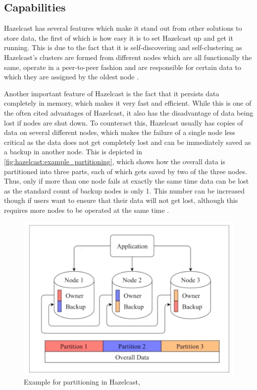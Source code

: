 \subsection{Capabilities} \label{subsec:capabilitiesHazelcast}

Hazelcast has several features which make it stand out from other solutions to store data, the first of which is how easy it is
to set Hazelcast up and get it running. This is due to the fact that it is self-discovering and self-clustering as Hazelcast's
clusters are formed from different nodes which are all functionally the same, operate in a peer-to-peer fashion and are responsible for
certain data to which they are assigned by the oldest node \parencite{Johns.2015}.

Another important feature of Hazelcast is the fact that it persists data completely in memory, which makes it very fast and efficient.
While this is one of the often cited advantages of Hazelcast, it also has the disadvantage of data being lost if nodes are shut down. To counteract this, Hazelcast usually has copies of data on several different nodes, which
makes the failure of a single node less critical as the data does not get completely lost and can be immediately saved as a backup
in another node. This is depicted in \autoref{fig:hazelcast:example_partitioning}, which shows how the overall data is partitioned into three parts, each of which gets saved by two of the three nodes. Thus, only if more than
one node fails at exactly the same time data can be lost as the standard count of backup nodes is only 1. This number can be increased though if users want to
ensure that their data will not get lost, although this requires more nodes to be operated at the same time \parencite{Johns.2015}.

\begin{figure}[H]
    \centering
    \caption[Example for partitioning in Hazelcast]{Example for partitioning in Hazelcast, \parencite{Johns.2015}} \label{fig:hazelcast:example_partitioning}
    \includegraphics[width=\textwidth]{images/hazelcast_partitioning.png}
\end{figure}

